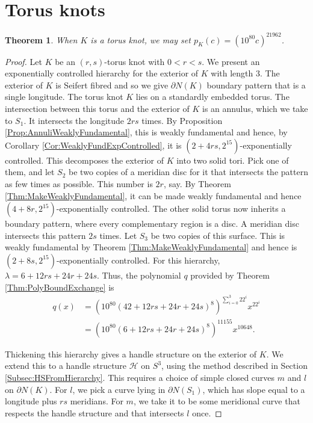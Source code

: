 \documentclass[oneside]{amsart}
\numberwithin{equation}{section}
\theoremstyle{plain}
\newtheorem{theorem}[equation]{Theorem}
\theoremstyle{definition}
\newcommand{\calH}{\mathcal{H}}
\begin{document}
\section{Torus knots}
\label{Sec:TorusKnots}

\begin{theorem}
When $K$ is a torus knot, we may set $p_K(c) = (10^{80}c)^{21962}$.
\end{theorem}

\begin{proof}
Let $K$ be an $(r,s)$-torus knot with $0 < r < s$.
We present an exponentially controlled hierarchy for the exterior of $K$ with length 3. 
The exterior of $K$ is Seifert fibred and so we give $\partial N(K)$ boundary pattern that is a single longitude.
The torus knot $K$ lies on a standardly embedded torus. The intersection between this torus and the
exterior of $K$ is an annulus, which we take to $S_1$. It intersects the longitude $2rs$ times. By Proposition \ref{Prop:AnnuliWeaklyFundamental}, this is weakly fundamental and hence, by Corollary \ref{Cor:WeaklyFundExpControlled}, it is $(2 + 4rs,2^{15})$-exponentially controlled. This decomposes the exterior of $K$ into two solid tori. Pick one of them, and let $S_2$ be two copies of a meridian disc for it that intersects the pattern as few times as possible. This number is $2r$, say. By Theorem \ref{Thm:MakeWeaklyFundamental}, it can be made weakly fundamental and hence $(4 + 8r,2^{15})$-exponentially controlled. The other solid torus now inherits a boundary pattern, where every complementary region is a disc. A meridian disc intersects this pattern $2s$ times. 
Let $S_3$ be two copies of this surface. This is weakly fundamental by Theorem \ref{Thm:MakeWeaklyFundamental} and hence is $(2 + 8s,2^{15})$-exponentially controlled.
For this hierarchy, $\lambda = 6 +12rs + 24r + 24s$. Thus, the polynomial $q$ provided by Theorem \ref{Thm:PolyBoundExchange} is
\begin{align*} q(x) &= (10^{80} (42 + 12rs + 24r + 24s)^8 )^{\sum_{i=0}^3 22^i } x^{22^i} \\
&= (10^{80} (6 +12rs + 24r + 24s)^8)^{11155} x^{10648}.
\end{align*}

Thickening this hierarchy gives a handle structure on the exterior of $K$. We extend this to a handle structure $\calH$ on $S^3$, using the method described in Section \ref{Subsec:HSFromHierarchy}. This requires a choice of simple closed curves $m$ and $l$ on $\partial N(K)$. For $l$, we pick a curve lying in $\partial N(S_1)$, which has
slope equal to a longitude plus $rs$ meridians. For $m$, we take it to be some meridional curve that respects the handle structure and that intersects $l$ once.


\end{proof}
\end{document}
